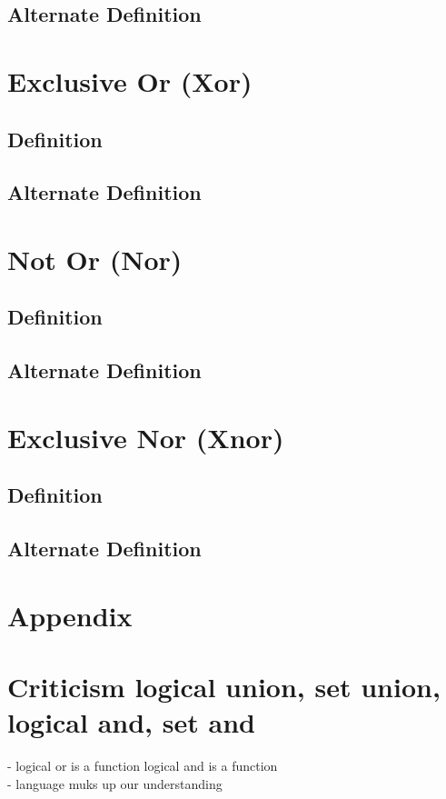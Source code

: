 \documentclass[11pt]{article}
\begin{document}
\subsection{Alternate Definition}



\section{Exclusive Or (Xor)}
\subsection{Definition}
\subsection{Alternate Definition}




\section{Not Or (Nor)}
\subsection{Definition}
\subsection{Alternate Definition}




\section{Exclusive Nor (Xnor)}
\subsection{Definition}
\subsection{Alternate Definition}

\newpage
\section*{Appendix}
\section{Criticism logical union, set union, logical and, set and}
- logical or is a function logical and is a function\\
- language muks up our understanding\\
\end{document}
